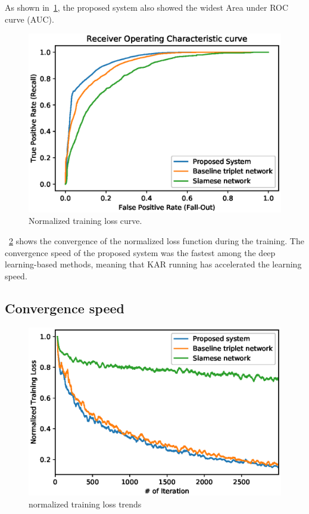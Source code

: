 As shown in~\ref{fig_roc}, the proposed system also showed the widest Area under ROC curve (AUC).
\begin{figure}[!ht]
    \includegraphics[width=\textwidth]{fig_roc_v15.eps}
    \caption{Normalized training loss curve.} \label{fig_roc}
\end{figure}
~\ref{fig_loss} shows the convergence of the normalized loss function during the training. The convergence speed of the proposed system was the fastest among the deep learning-based methods, meaning that KAR running has accelerated the learning speed.
\subsection{Convergence speed}
 \begin{figure}[!ht]
    \includegraphics[width=\textwidth]{normalized_loss_curve_ma30_v3.eps}
    \caption{normalized training loss trends} \label{fig_loss}
\end{figure}
